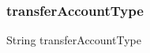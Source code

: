 \subsubsection{\texorpdfstring{transfer\+Account\+Type}{transferAccountType}}
{\footnotesize\ttfamily String transfer\+Account\+Type}

